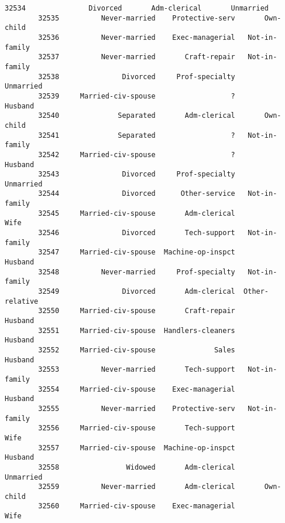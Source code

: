 \documentclass[11pt]{article}
\begin{document}
\begin{Verbatim}[commandchars=\\\{\}]
        32534               Divorced       Adm-clerical       Unmarried   
        32535          Never-married    Protective-serv       Own-child   
        32536          Never-married    Exec-managerial   Not-in-family   
        32537          Never-married       Craft-repair   Not-in-family   
        32538               Divorced     Prof-specialty       Unmarried   
        32539     Married-civ-spouse                  ?         Husband   
        32540              Separated       Adm-clerical       Own-child   
        32541              Separated                  ?   Not-in-family   
        32542     Married-civ-spouse                  ?         Husband   
        32543               Divorced     Prof-specialty       Unmarried   
        32544               Divorced      Other-service   Not-in-family   
        32545     Married-civ-spouse       Adm-clerical            Wife   
        32546               Divorced       Tech-support   Not-in-family   
        32547     Married-civ-spouse  Machine-op-inspct         Husband   
        32548          Never-married     Prof-specialty   Not-in-family   
        32549               Divorced       Adm-clerical  Other-relative   
        32550     Married-civ-spouse       Craft-repair         Husband   
        32551     Married-civ-spouse  Handlers-cleaners         Husband   
        32552     Married-civ-spouse              Sales         Husband   
        32553          Never-married       Tech-support   Not-in-family   
        32554     Married-civ-spouse    Exec-managerial         Husband   
        32555          Never-married    Protective-serv   Not-in-family   
        32556     Married-civ-spouse       Tech-support            Wife   
        32557     Married-civ-spouse  Machine-op-inspct         Husband   
        32558                Widowed       Adm-clerical       Unmarried   
        32559          Never-married       Adm-clerical       Own-child   
        32560     Married-civ-spouse    Exec-managerial            Wife   
        

\end{Verbatim}
\end{document}
